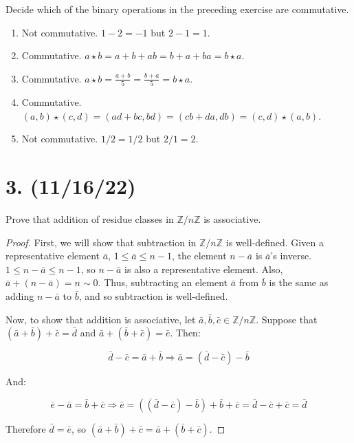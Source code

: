 \documentclass{article}
\begin{document}
Decide which of the binary operations in the preceding exercise are commutative.

\begin{enumerate}[label=\alph*)]
    \item Not commutative. $1 - 2 = -1$ but $2 - 1 = 1$.
    \item Commutative. $a \star b = a + b + ab = b + a + ba = b \star a$.
    \item Commutative. $a \star b = \frac{a + b}{5} = \frac{b + a}{5} = b \star a$.
    \item Commutative. $(a,b)\star(c,d) = (ad + bc, bd) = (cb + da, db) = (c,d)\star(a,b)$.
    \item Not commutative. $1 / 2 = 1/2$ but $2 / 1 = 2$.
\end{enumerate}

\section*{3. (11/16/22)}

Prove that addition of residue classes in $\mathbb{Z}/n\mathbb{Z}$ is associative.

\begin{proof}

      First, we will show that subtraction in $\mathbb{Z}/n\mathbb{Z}$ is well-defined. Given a representative element $\bar{a}$, $1 \leq \bar{a} \leq n - 1$, the element $n - \bar{a}$ is $\bar{a}$'s inverse. $1 \leq n - \bar{a} \leq n - 1$, so $n - \bar{a}$ is also a representative element. Also, $\bar{a} + (n - \bar{a}) = n \sim 0$. Thus, subtracting an element $\bar{a}$ from $\bar{b}$ is the same as adding $n - \bar{a}$ to $\bar{b}$, and so subtraction is well-defined.

      Now, to show that addition is associative, let $\bar{a}, \bar{b}, \bar{c} \in \mathbb{Z}/n\mathbb{Z}$. Suppose that $(\bar{a} + \bar{b}) + \bar{c} = \bar{d}$ and $\bar{a} + (\bar{b} + \bar{c}) = \bar{e}$. Then:

      \begin{equation*}
            \bar{d} - \bar{c} = \bar{a} + \bar{b} \Rightarrow \bar{a} = (\bar{d} - \bar{c}) - \bar{b}
      \end{equation*}

      And:

      \begin{equation*}
            \bar{e} - \bar{a} = \bar{b} + \bar{c} \Rightarrow \bar{e} = ((\bar{d} - \bar{c}) - \bar{b}) + \bar{b} + \bar{c} = \bar{d} - \bar{c} + \bar{c} = \bar{d} 
      \end{equation*}

      Therefore $\bar{d} = \bar{e}$, so $(\bar{a} + \bar{b}) + \bar{c} = \bar{a} + (\bar{b} + \bar{c})$.
\end{proof}
\end{document}
